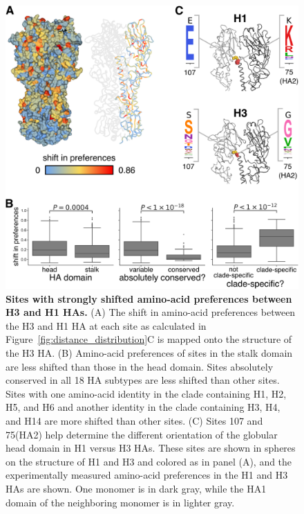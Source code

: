\documentclass[9pt,twocolumn,twoside]{pnas-new-for-biorxiv}
\begin{document}
\begin{figure}
\centering
\includegraphics[width=\columnwidth]{figs/RMSD_heatmap/RMSD_heatmap.pdf}
\caption{\label{fig:RMSD_heatmap}
{\bf Sites with strongly shifted amino-acid preferences between H3 and H1 HAs.}
(A) The shift in amino-acid preferences between the H3 and H1 HA at each site as calculated in Figure~\ref{fig:distance_distribution}C is mapped onto the structure of the H3 HA.
(B) Amino-acid preferences of sites in the stalk domain are less shifted than those in the head domain.
Sites absolutely conserved in all 18 HA subtypes are less shifted than other sites.
Sites with one amino-acid identity in the clade containing H1, H2, H5, and H6 and another identity in the clade containing H3, H4, and H14 are more shifted than other sites.
(C) Sites 107 and 75(HA2) help determine the different orientation of the globular head domain in H1 versus H3 HAs.
These sites are shown in spheres on the structure of H1 and H3 and colored as in panel (A), and the experimentally measured amino-acid preferences in the H1 and H3 HAs are shown.
One monomer is in dark gray, while the HA1 domain of the neighboring monomer is in lighter gray.
}
\end{figure}
\end{document}
